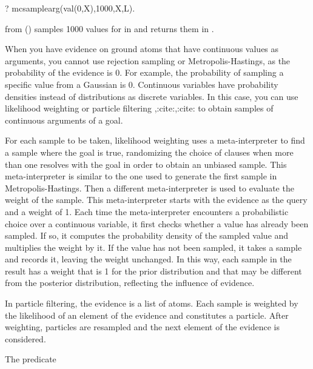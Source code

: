 \documentclass[letterpaper,10pt,english]{sphinxmanual}
\begin{document}
\begin{sphinxVerbatim}[commandchars=\\\{\}]
?\PYGZhy{} mc\PYGZus{}sample\PYGZus{}arg(val(0,X),1000,X,L).
\end{sphinxVerbatim}

from () samples 1000 values for  in  and returns them in .

When you have evidence on ground atoms that have continuous values as arguments, you cannot use rejection sampling or Metropolis-Hastings, as the probability of the evidence is 0. For example, the probability of sampling a specific value from a Gaussian is 0.
Continuous variables have probability densities instead of distributions as discrete variables. In this case, you can use likelihood weighting or particle filtering ,:cite:,:cite: to obtain samples of continuous arguments of a goal.

For each sample to be taken, likelihood weighting uses a meta-interpreter to find a sample where the goal is true, randomizing the choice of clauses when more than one resolves with the goal in order to obtain an unbiased sample.
This meta-interpreter is similar to the one used to generate the first sample in Metropolis-Hastings.
Then a different meta-interpreter is used to evaluate the weight of the sample.
This meta-interpreter starts with the evidence as the query and a weight of 1.
Each time the meta-interpreter encounters a probabilistic choice over a continuous variable, it first checks whether a value has already been sampled.
If so, it computes the probability density of the sampled value and multiplies the weight by it.
If the value has not been sampled, it takes a sample and records it, leaving the weight unchanged.
In this way, each sample in the result has a weight that is 1 for the prior distribution and that may be different from the posterior distribution, reflecting the influence of evidence.

In particle filtering, the evidence is a list of atoms. Each sample is weighted by the likelihood of an element of the evidence and constitutes a particle.
After weighting, particles are resampled and the next element of the evidence is considered.

The predicate
\end{document}
